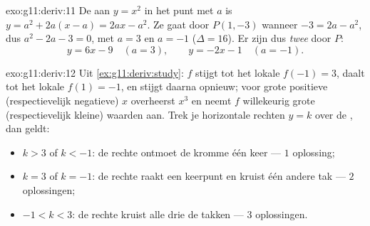\begin{solution}{exo:g11:deriv:11}
De  aan $y = x^2$ in het punt met  $a$ is
$y = a^2 + 2a(x - a) = 2ax - a^2$. Ze gaat door $P(1, -3)$ wanneer
$-3 = 2a - a^2$, dus $a^2 - 2a - 3 = 0$, met  $a = 3$ en $a = -1$
($\Delta = 16$). Er zijn dus \emph{twee}  door $P$:
\[
y = 6x - 9 \quad (a = 3),
\qquad
y = -2x - 1 \quad (a = -1).
\]
\end{solution}

\begin{solution}{exo:g11:deriv:12}
Uit \cref{ex:g11:deriv:study}: $f$ stijgt tot het lokale 
$f(-1) = 3$, daalt tot het lokale  $f(1) = -1$, en stijgt daarna
opnieuw; voor grote positieve (respectievelijk negatieve) $x$ overheerst
$x^3$ en neemt $f$ willekeurig grote (respectievelijk kleine) waarden aan.
Trek je horizontale rechten $y = k$ over de , dan geldt:
\begin{itemize}
  \item $k > 3$ of $k < -1$: de rechte ontmoet de kromme één keer ---
        $1$ oplossing;
  \item $k = 3$ of $k = -1$: de rechte raakt een keerpunt en kruist één
        andere tak --- $2$ oplossingen;
  \item $-1 < k < 3$: de rechte kruist alle drie de takken ---
        $3$ oplossingen.
\end{itemize}
\end{solution}

